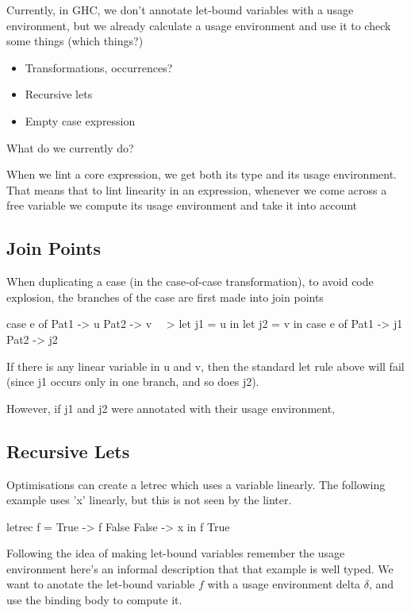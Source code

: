 \documentclass[a4paper, draft]{article}
\begin{document}
Currently, in GHC, we don't annotate let-bound variables with a usage
environment, but we already calculate a usage environment and use it to check
some things (which things?)

\begin{itemize}
    \item Transformations, occurrences?
    \item Recursive lets
    \item Empty case expression
\end{itemize}

What do we currently do?

When we lint a core expression, we get both its type and its usage environment.
That means that to lint linearity in an expression, whenever we come across a
free variable we compute its usage environment and take it into account

\subsection{Join Points}

When duplicating a case (in the case-of-case transformation), to avoid code
explosion, the branches of the case are first made into join points

\begin{code}
case e of
  Pat1 -> u
  Pat2 -> v
~~>
let j1 = u in
let j2 = v in
case e of
  Pat1 -> j1
  Pat2 -> j2
\end{code}

If there is any linear variable in u and v, then the standard
let rule above will fail (since j1 occurs only in one branch, and
so does j2).

However, if j1 and j2 were annotated with their usage environment,

\subsection{Recursive Lets}

Optimisations can create a letrec which uses a variable linearly. The following
example uses 'x' linearly, but this is not seen by the linter.
\begin{code}
letrec f = \case
        True -> f False
        False -> x
in f True
\end{code}

Following the idea of making let-bound variables remember the usage environment
here's an informal description that that example is well typed. We want to
anotate the let-bound variable $f$ with a usage environment delta $\delta$, and
use the binding body to compute it.
\end{document}
